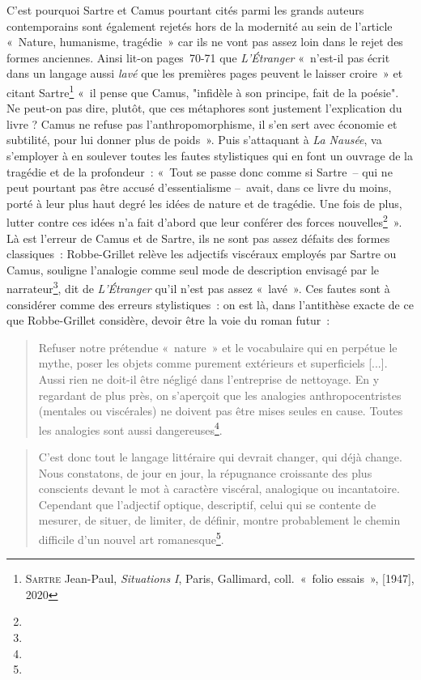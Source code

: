 C'est pourquoi Sartre et Camus pourtant cités parmi les grands auteurs contemporains sont également rejetés hors de la modernité au sein de l'article «~Nature, humanisme, tragédie~» car ils ne vont pas assez loin dans le rejet des formes anciennes. Ainsi lit-on pages~70-71 que \textit{L'Étranger} «~n’est-il pas écrit dans un langage aussi \textit{lavé} que les premières pages peuvent le laisser croire~» et citant Sartre\footnote{\textsc{Sartre} Jean-Paul, \textit{Situations I}, Paris, Gallimard, coll.~«~folio essais~», [1947], 2020} «~il pense que Camus, "infidèle à son principe, fait de la poésie". Ne peut-on pas dire, plutôt, que ces métaphores sont justement l’explication du livre ? Camus ne refuse pas l’anthropomorphisme, il s’en sert avec économie et subtilité, pour lui donner plus de poids~». Puis s'attaquant à \textit{La Nausée}, \robbe{} va s'employer à en soulever toutes les fautes stylistiques qui en font un ouvrage de la tragédie et de la profondeur~: «~Tout se passe donc comme si Sartre~– qui ne peut pourtant pas être accusé d’essentialisme –~avait, dans ce livre du moins, porté à leur plus haut degré les idées de nature et de tragédie. Une fois de plus, lutter contre ces idées n’a fait d’abord que leur conférer des forces nouvelles\footnote{}~».
Là est l'erreur de Camus et de Sartre, ils ne sont pas assez défaits des formes classiques~: Robbe-Grillet relève les adjectifs viscéraux employés par Sartre ou Camus, souligne l'analogie comme seul mode de description envisagé par le narrateur\footnote{}, dit de \textit{L'Étranger} qu'il n'est pas assez «~lavé~». Ces fautes sont à considérer comme des erreurs stylistiques~: on est là, dans l'antithèse exacte de ce que Robbe-Grillet considère, devoir être la voie du roman futur~:

\begin{quote}
    Refuser notre prétendue «~nature~» et le vocabulaire qui en perpétue le mythe, poser les objets comme purement extérieurs et superficiels [...]. Aussi rien ne doit-il être négligé dans l’entreprise de nettoyage. En y regardant de plus près, on s’aperçoit que les analogies anthropocentristes (mentales ou viscérales) ne doivent pas être mises seules en cause. Toutes les analogies sont aussi dangereuses\footnote{}.
\end{quote}

\begin{quote}
    C’est donc tout le langage littéraire qui devrait changer, qui déjà change. Nous constatons, de jour en jour, la répugnance croissante des plus conscients devant le mot à caractère viscéral, analogique ou incantatoire. Cependant que l’adjectif optique, descriptif, celui qui se contente de mesurer, de situer, de limiter, de définir, montre probablement le chemin difficile d’un nouvel art romanesque\footnote{}.
\end{quote}


